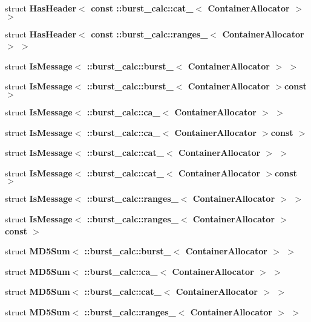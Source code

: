 \begin{DoxyCompactItemize}
struct {\bf \-Has\-Header$<$ const \-::burst\-\_\-calc\-::cat\-\_\-$<$ Container\-Allocator $>$ $>$}
\item 
struct {\bf \-Has\-Header$<$ const \-::burst\-\_\-calc\-::ranges\-\_\-$<$ Container\-Allocator $>$ $>$}
\item 
struct {\bf \-Is\-Message$<$ \-::burst\-\_\-calc\-::burst\-\_\-$<$ Container\-Allocator $>$ $>$}
\item 
struct {\bf \-Is\-Message$<$ \-::burst\-\_\-calc\-::burst\-\_\-$<$ Container\-Allocator $>$const  $>$}
\item 
struct {\bf \-Is\-Message$<$ \-::burst\-\_\-calc\-::ca\-\_\-$<$ Container\-Allocator $>$ $>$}
\item 
struct {\bf \-Is\-Message$<$ \-::burst\-\_\-calc\-::ca\-\_\-$<$ Container\-Allocator $>$const  $>$}
\item 
struct {\bf \-Is\-Message$<$ \-::burst\-\_\-calc\-::cat\-\_\-$<$ Container\-Allocator $>$ $>$}
\item 
struct {\bf \-Is\-Message$<$ \-::burst\-\_\-calc\-::cat\-\_\-$<$ Container\-Allocator $>$const  $>$}
\item 
struct {\bf \-Is\-Message$<$ \-::burst\-\_\-calc\-::ranges\-\_\-$<$ Container\-Allocator $>$ $>$}
\item 
struct {\bf \-Is\-Message$<$ \-::burst\-\_\-calc\-::ranges\-\_\-$<$ Container\-Allocator $>$const  $>$}
\item 
struct {\bf \-M\-D5\-Sum$<$ \-::burst\-\_\-calc\-::burst\-\_\-$<$ Container\-Allocator $>$ $>$}
\item 
struct {\bf \-M\-D5\-Sum$<$ \-::burst\-\_\-calc\-::ca\-\_\-$<$ Container\-Allocator $>$ $>$}
\item 
struct {\bf \-M\-D5\-Sum$<$ \-::burst\-\_\-calc\-::cat\-\_\-$<$ Container\-Allocator $>$ $>$}
\item 
struct {\bf \-M\-D5\-Sum$<$ \-::burst\-\_\-calc\-::ranges\-\_\-$<$ Container\-Allocator $>$ $>$}
\end{DoxyCompactItemize}
